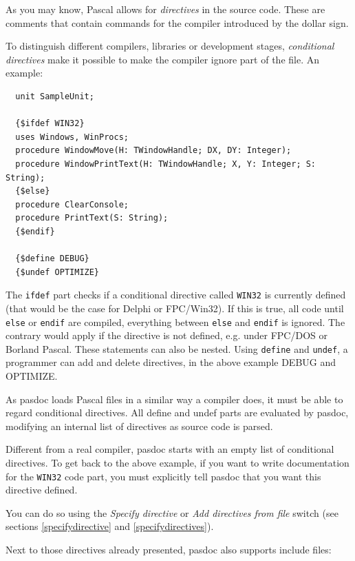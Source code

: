 \documentclass[11pt]{article}
\begin{document}
As you may know, Pascal allows for \emph{directives} in the source code.
These are comments that contain commands for the compiler introduced by the
dollar sign.

To distinguish different compilers, libraries or development stages,
\emph{conditional directives} make it possible to make the compiler ignore
part of the file.
An example:

\begin{verbatim}
  unit SampleUnit;

  {$ifdef WIN32}
  uses Windows, WinProcs;
  procedure WindowMove(H: TWindowHandle; DX, DY: Integer);
  procedure WindowPrintText(H: TWindowHandle; X, Y: Integer; S: String);
  {$else}
  procedure ClearConsole;
  procedure PrintText(S: String);
  {$endif}

  {$define DEBUG}
  {$undef OPTIMIZE}
\end{verbatim}

The {\tt ifdef} part checks if a conditional directive called {\tt WIN32} is
currently defined (that would be the case for Delphi or FPC/Win32).
If this is true, all code until {\tt else} or {\tt endif} are compiled,
everything between {\tt else} and {\tt endif} is ignored.
The contrary would apply if the directive is not defined, e.g. under FPC/DOS
or Borland Pascal.
These statements can also be nested.
Using {\tt define} and {\tt undef}, a programmer can add and delete
directives, in the above example DEBUG and OPTIMIZE.

As pasdoc loads Pascal files in a similar way a compiler does, it must be able
to regard conditional directives. All define and undef parts are evaluated by
pasdoc, modifying an internal list of directives as source code is parsed.

Different from a real compiler, pasdoc starts with an empty list of
conditional directives. To get back to the above example, if you want to write
documentation for the {\tt WIN32} code part, you must explicitly tell pasdoc
that you want this directive defined.

You can do so using the \emph{Specify directive} or \emph{Add directives from
file} switch (see sections \ref{specifydirective} and \ref{specifydirectives}).

Next to those directives already presented, pasdoc also supports include
files:
\end{document}
